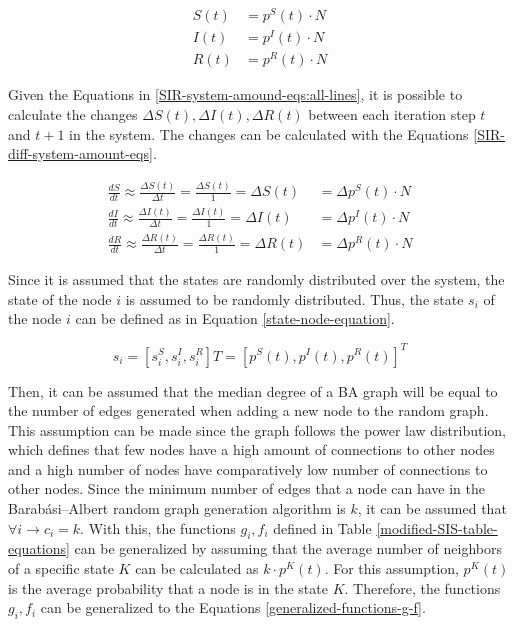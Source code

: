 \begin{subequations}
\begin{align}
    S(t) &=p^S(t)\cdot N \label{SIR-system-amound-eqs:1}\\
    I(t) &=p^I(t)\cdot N \label{SIR-system-amound-eqs:2}\\
    R(t) &=p^R(t)\cdot N \label{SIR-system-amound-eqs:3}
\end{align}
\label{SIR-system-amound-eqs:all-lines}
\end{subequations}

Given the Equations in \ref{SIR-system-amound-eqs:all-lines}, it is possible 
to calculate the changes $\Delta S(t), \Delta I(t), \Delta R(t)$ between each 
iteration step $t$ and $t+1$ in the system.
The changes can be calculated with the Equations \ref{SIR-diff-system-amount-eqs}.

\begin{subequations}
\begin{align}
    \frac{dS}{dt} \approx \frac{\Delta S(t)}{\Delta t} = \frac{\Delta S(t)}{1} = \Delta S(t) &=\Delta p^S(t)\cdot N \label{SIR-diff-system-amount-eqs:1}\\
    \frac{dI}{dt} \approx \frac{\Delta I(t)}{\Delta t} = \frac{\Delta I(t)}{1} = \Delta I(t) &=\Delta p^I(t)\cdot N \label{SIR-diff-system-amount-eqs:2}\\
    \frac{dR}{dt} \approx \frac{\Delta R(t)}{\Delta t} = \frac{\Delta R(t)}{1} = \Delta R(t) &=\Delta p^R(t)\cdot N \label{SIR-diff-system-amount-eqs:3}
\end{align}
\label{SIR-diff-system-amount-eqs}
\end{subequations}

Since it is assumed that the states are randomly distributed over the system, 
the state of the node $i$ is assumed to be randomly distributed.
Thus, the state $s_i$ of the node $i$ can be defined as in Equation 
\ref{state-node-equation}.

\begin{equation}
    s_i = [s_i^S, s_i^I, s_i^R]T = [p^S(t), p^I(t), p^R(t)]^T
    \label{state-node-equation}
\end{equation}

Then, it can be assumed that the median degree of a BA graph
will be equal to the number of edges generated when adding a new 
node to the random graph.
This assumption can be made since the graph follows the power law distribution,
which defines that few nodes have a high amount of connections to other nodes
and a high number of nodes have comparatively low number of connections to 
other nodes. Since the minimum number of edges that a node can have 
in the Barabási–Albert random graph generation algorithm is $k$, it 
can be assumed that $\forall i \to c_i=k$.
With this, the functions $g_i,f_i$ defined in Table 
\ref{modified-SIS-table-equations}
can be generalized by assuming that the average number of neighbors 
of a specific state $K$ can be calculated as $k\cdot p^K(t)$. For this
assumption, $p^K(t)$ is the 
average probability that a node is in the state $K$.
Therefore, the functions $g_i,f_i$ can be generalized to the
Equations \ref{generalized-functions-g-f}.

